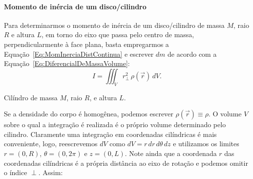 \paragraph{Momento de inércia de um disco/cilindro}

Para determinarmos o momento de inércia de um disco/cilindro de massa $M$, raio $R$ e altura $L$, em torno do eixo que passa pelo centro de massa, perpendicularmente à face plana, basta empregarmos a Equação~\eqref{Eq:MomInerciaDistContinua} e escrever $dm$ de acordo com a Equação~\eqref{Eq:DiferencialDeMassaVolume}:
\begin{equation}
    I = \iiint_V r_\perp^2 \, \rho(\vec{r}) \, dV.
\end{equation}
%
\begin{marginfigure}[-4cm]
    \centering
    \caption{Cilíndro de massa $M$, raio $R$, e altura $L$. \label{Fig:MomInerciaDiscoCilindro}}
\end{marginfigure}
%
Se a densidade do corpo é homogênea, podemos escrever $\rho(\vec{r}) \equiv \rho$. O volume $V$ sobre o qual a integração é realizada é o próprio volume determinado pelo cilindro. Claramente uma integração em coordenadas cilíndricas é mais conveniente, logo, reescrevemos $dV$ como $dV = r \, dr \, d\theta \, dz$ e utilizamos os limites $r = (0, R)$, $\theta = (0, 2\pi)$ e $z = (0,L)$. Note ainda que a coordenada $r$ das coordenadas cilíndricas é a própria distância ao eixo de rotação e podemos omitir o índice $\perp$. Assim:
